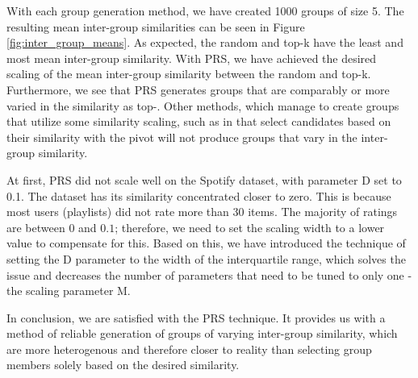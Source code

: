 With each group generation method, we have created 1000 groups of size 5. The resulting mean inter-group similarities can be seen in Figure \ref{fig:inter_group_means}. As expected, the random and top-k have the least and most mean inter-group similarity. With PRS, we have achieved the desired scaling of the mean inter-group similarity between the random and top-k. Furthermore, we see that PRS generates groups that are comparably or more varied in the similarity as top-. Other methods, which manage to create groups that utilize some similarity scaling, such as in \cite{GFAR-kaya2020} that select candidates based on their similarity with the pivot will not produce groups that vary in the inter-group similarity.

At first, PRS did not scale well on the Spotify dataset, with parameter D set to 0.1. The dataset has its similarity concentrated closer to zero. This is because most users (playlists) did not rate more than 30 items. The majority of ratings are between $0$ and $0.1$; therefore, we need to set the scaling width to a lower value to compensate for this. Based on this, we have introduced the technique of setting the D parameter to the width of the interquartile range, which solves the issue and decreases the number of parameters that need to be tuned to only one - the scaling parameter M. 

In conclusion, we are satisfied with the PRS technique. It provides us with a method of reliable generation of groups of varying inter-group similarity, which are more heterogenous and therefore closer to reality than selecting group members solely based on the desired similarity.




